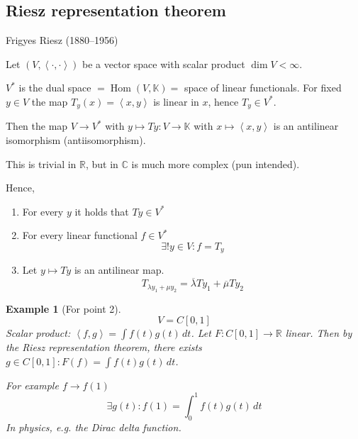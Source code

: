 \documentclass{article}
\newtheorem{example}{Example}  \numberwithin{example}{section}
\newcommand{\ip}[2]{\left\langle#1,#2\right\rangle} %
\begin{document}
\subsection{Riesz representation theorem}

Frigyes Riesz (1880--1956)

Let $(V, \ip{\cdot}{\cdot})$ be a vector space with scalar product $\dim{V} < \infty$.

$V^*$ is the dual space $= \operatorname{Hom}(V, \mathbb K) = $ space of linear functionals.
For fixed $y \in V$ the map $T_y(x) = \ip{x}{y}$ is linear in $x$, hence $T_y \in V^*$.

Then the map $V \to V^*$ with $y \mapsto Ty: V \to \mathbb K$ with $x \mapsto \ip xy$ is an antilinear isomorphism (antiisomorphism).

This is trivial in $\mathbb R$, but in $\mathbb C$ is much more complex (pun intended).

Hence,
\begin{enumerate}
  \item For every $y$ it holds that $Ty \in V^*$
  \item For every linear functional $f \in V^*$
    \[ \exists! y \in V: f = T_y \]
  \item Let $y \mapsto Ty$ is an antilinear map.
    \[ T_{\lambda y_1 + \mu y_2} = \overline{\lambda} Ty_1 + \overline{\mu} Ty_2 \]
\end{enumerate}

\begin{example}[For point 2]
  \[ V = C[0,1] \]
  Scalar product: $\ip fg = \int f(t) g(t) \, dt$.
  Let $F: C[0,1] \to \mathbb R$ linear.
  Then by the Riesz representation theorem,
  there exists $g \in C[0,1]: F(f) = \int f(t) g(t) \, dt$.

  For example $f \to f(1)$
  \[ \exists g(t): f(1) = \int_0^1 f(t) g(t) \, dt \]
  In physics, e.g. the Dirac delta function.
\end{example}
\end{document}

